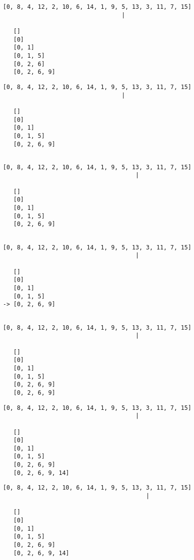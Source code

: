 { \begin{verbatim}
[0, 8, 4, 12, 2, 10, 6, 14, 1, 9, 5, 13, 3, 11, 7, 15]
                                  |

   []
   [0]
   [0, 1]
   [0, 1, 5]
   [0, 2, 6]
   [0, 2, 6, 9]

\end{verbatim} }

{ \begin{verbatim}
[0, 8, 4, 12, 2, 10, 6, 14, 1, 9, 5, 13, 3, 11, 7, 15]
                                  |

   []
   [0]
   [0, 1]
   [0, 1, 5]
   [0, 2, 6, 9]


\end{verbatim} }

{ \begin{verbatim}
[0, 8, 4, 12, 2, 10, 6, 14, 1, 9, 5, 13, 3, 11, 7, 15]
                                      |

   []
   [0]
   [0, 1]
   [0, 1, 5]
   [0, 2, 6, 9]


\end{verbatim} }

{ \begin{verbatim}
[0, 8, 4, 12, 2, 10, 6, 14, 1, 9, 5, 13, 3, 11, 7, 15]
                                      |

   []
   [0]
   [0, 1]
   [0, 1, 5]
-> [0, 2, 6, 9]


\end{verbatim} }

{ \begin{verbatim}
[0, 8, 4, 12, 2, 10, 6, 14, 1, 9, 5, 13, 3, 11, 7, 15]
                                      |

   []
   [0]
   [0, 1]
   [0, 1, 5]
   [0, 2, 6, 9]
   [0, 2, 6, 9]

\end{verbatim} }

{ \begin{verbatim}
[0, 8, 4, 12, 2, 10, 6, 14, 1, 9, 5, 13, 3, 11, 7, 15]
                                      |

   []
   [0]
   [0, 1]
   [0, 1, 5]
   [0, 2, 6, 9]
   [0, 2, 6, 9, 14]

\end{verbatim} }

{ \begin{verbatim}
[0, 8, 4, 12, 2, 10, 6, 14, 1, 9, 5, 13, 3, 11, 7, 15]
                                         |

   []
   [0]
   [0, 1]
   [0, 1, 5]
   [0, 2, 6, 9]
   [0, 2, 6, 9, 14]

\end{verbatim} }

